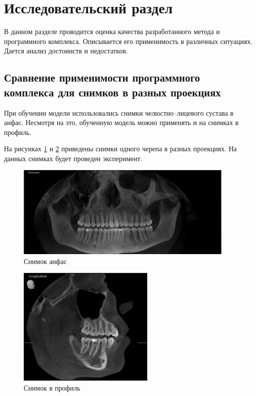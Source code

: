 \section{Исследовательский раздел}

В данном разделе проводится оценка качества разработанного метода и программного комплекса. Описывается его применимость в различных ситуациях. Дается анализ достоинств и недостатков.

\subsection{Сравнение применимости программного комплекса для снимков в разных проекциях}

При обучении модели использовались снимки челюстно--лицевого сустава в анфас. Несмотря на это, обученную модель можно применять и на снимках в профиль.

На рисунках \ref{fig:anfas} и \ref{fig:profile} приведены снимки одного черепа в разных проекциях. На данных снимках будет проведен эксперимент.

\begin{figure}[H]
	\centering
	\includegraphics[width=400px]{img/anfas.jpeg}
	\caption{Снимок анфас}
	\label{fig:anfas}
\end{figure}

\begin{figure}[H]
	\centering
	\includegraphics[width=250px]{img/profile.jpeg}
	\caption{Снимок в профиль}
	\label{fig:profile}
\end{figure}

